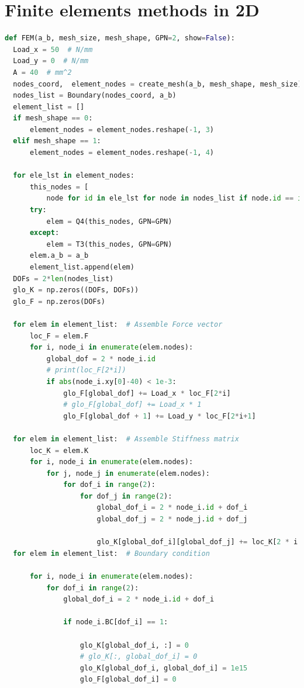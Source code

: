 \documentclass[twoside,twocolumn,10pt]{article}
\begin{document}
\section{Finite elements methods in 2D}
\label{Apdx:FEM_2D}
\begin{lstlisting}[language=Python, caption=Finite elements methods in 2D]
  def FEM(a_b, mesh_size, mesh_shape, GPN=2, show=False):
  Load_x = 50  # N/mm
  Load_y = 0  # N/mm
  A = 40  # mm^2
  nodes_coord,  element_nodes = create_mesh(a_b, mesh_shape, mesh_size)
  nodes_list = Boundary(nodes_coord, a_b)
  element_list = []
  if mesh_shape == 0:
      element_nodes = element_nodes.reshape(-1, 3)
  elif mesh_shape == 1:
      element_nodes = element_nodes.reshape(-1, 4)

  for ele_lst in element_nodes:
      this_nodes = [
          node for id in ele_lst for node in nodes_list if node.id == id]
      try:
          elem = Q4(this_nodes, GPN=GPN)
      except:
          elem = T3(this_nodes, GPN=GPN)
      elem.a_b = a_b
      element_list.append(elem)
  DOFs = 2*len(nodes_list)
  glo_K = np.zeros((DOFs, DOFs))
  glo_F = np.zeros(DOFs)

  for elem in element_list:  # Assemble Force vector
      loc_F = elem.F
      for i, node_i in enumerate(elem.nodes):
          global_dof = 2 * node_i.id
          # print(loc_F[2*i])
          if abs(node_i.xy[0]-40) < 1e-3:
              glo_F[global_dof] += Load_x * loc_F[2*i]
              # glo_F[global_dof] += Load_x * 1 
              glo_F[global_dof + 1] += Load_y * loc_F[2*i+1]

  for elem in element_list:  # Assemble Stiffness matrix
      loc_K = elem.K
      for i, node_i in enumerate(elem.nodes):
          for j, node_j in enumerate(elem.nodes):
              for dof_i in range(2):  
                  for dof_j in range(2):
                      global_dof_i = 2 * node_i.id + dof_i
                      global_dof_j = 2 * node_j.id + dof_j

                      glo_K[global_dof_i][global_dof_j] += loc_K[2 * i + dof_i][2*j + dof_j]
  for elem in element_list:  # Boundary condition

      for i, node_i in enumerate(elem.nodes):
          for dof_i in range(2):  
              global_dof_i = 2 * node_i.id + dof_i

              if node_i.BC[dof_i] == 1:

                  glo_K[global_dof_i, :] = 0
                  # glo_K[:, global_dof_i] = 0
                  glo_K[global_dof_i, global_dof_i] = 1e15  
                  glo_F[global_dof_i] = 0


\end{lstlisting}
\end{document}
